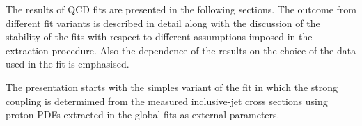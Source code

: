 The results of QCD fits are presented in the following sections. The outcome from different fit variants is described in detail along with the discussion of the stability of the fits with respect to different assumptions imposed in the \asz extraction procedure. Also the dependence of the results on the choice of the data used in the fit is emphasised.

The presentation starts with the simples variant of the fit in which the strong coupling \asz is determimed from the measured inclusive-jet cross sections using proton PDFs extracted in the global fits as external parameters.